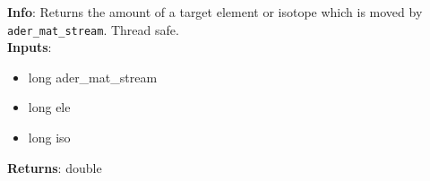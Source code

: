 \textbf{Info}: Returns the amount of a target element or isotope which is moved
by \texttt{ader\_mat\_stream}. Thread safe.\\

\noindent \textbf{Inputs}:
\begin{itemize}
\item{long ader\_mat\_stream}
\item{long ele}
\item{long iso}
\end{itemize}

\noindent \textbf{Returns}: double
